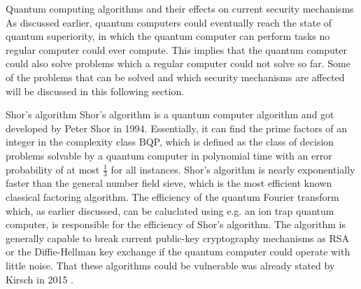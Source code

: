 \documentclass[aps,preprintnumbers,twocolumn]{revtex4}
\begin{document}
\begin{section}{Quantum computing algorithms and their effects on current security mechanisms}
As discussed earlier, quantum computers could eventually reach the state of quantum superiority, 
in which the quantum computer can perform tasks no regular computer could ever compute.
This implies that the quantum computer could also solve problems which a regular computer could not solve so far.
Some of the problems that can be solved and which security mechanisms are affected will be discussed in this following section. 

\begin{subsection}{Shor's algorithm}
Shor's algorithm is a quantum computer algorithm and got developed by Peter Shor in 1994.
Essentially, it can find the prime factors of an integer in the complexity class BQP,
which is defined as the class of decision problems solvable by a quantum computer in polynomial time with an error probability of at most $\frac{1}{3}$ for all instances. 
Shor's algorithm is nearly exponentially faster than the general number field sieve, which is the most efficient known classical factoring algorithm.
The efficiency of the quantum Fourier transform which, as earlier discussed, can be caluclated using e.g. an ion trap quantum computer, is responsible for the efficiency of Shor's algorithm.
The algorithm is generally capable to break current public-key cryptography mechanisms as RSA or the Diffie-Hellman key exchange if the quantum computer could operate with little noise. 
That these algorithms could be vulnerable was already stated by Kirsch in 2015
\cite[p.6]{Kirsch2015QuantumCT}.


\end{subsection}
\end{section}
\end{document}
